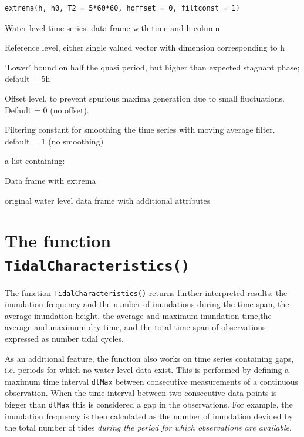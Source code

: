 \documentclass[10pt,a4wide]{article}
\begin{document}
\begin{Usage}
\begin{verbatim}extrema(h, h0, T2 = 5*60*60, hoffset = 0, filtconst = 1)\end{verbatim}
\end{Usage}
\begin{Arguments}
\begin{ldescription}
\item[\code{h }] Water level time series. data frame with time and h column
\item[\code{h0 }] Reference level, either single valued vector with dimension corresponding to h
\item[\code{T2 }] 'Lower' bound on half the quasi period, but higher than expected stagnant phase; default = 5h
\item[\code{hoffset}] Offset level, to prevent spurious maxima generation due to small fluctuations. Default = 0 (no offset).
\item[\code{filtconst }] Filtering constant for smoothing the time series with moving average filter. default = 1 (no smoothing)
\end{ldescription}
\end{Arguments}
\begin{Value}
a list containing:
\begin{ldescription}
\item[\code{HL }] Data frame with extrema
\item[\code{h }] original water level data frame with additional attributes
\end{ldescription}
\end{Value}

\section{The function \texttt{TidalCharacteristics()}}
The function \texttt{TidalCharacteristics()} returns further interpreted results: the inundation frequency and the number of inundations during the time span, the average inundation height, the average and maximum inundation time,the average and maximum dry time, and the total time span of observations expressed as number tidal cycles.

As an additional feature, the function also works on time series containing gaps, i.e. periods for which no water level data exist. This is performed by defining a maximum time interval \texttt{dtMax} between consecutive measurements of a continuous observation. When the time interval between two consecutive data points is bigger than \texttt{dtMax} this is considered a gap in the observations. For example, the inundation frequency is then calculated as the number of inundation devided by the total number of tides \emph{during the period for which observations are available}.
\end{document}
